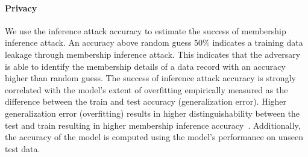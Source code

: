 \paragraph{Privacy}
We use the inference attack accuracy to estimate the success of membership inference attack.
An accuracy above random guess $50\%$ indicates a training data leakage through membership inference attack.
This indicates that the adversary is able to identify the membership details of a data record with an accuracy higher than random guess.
The success of inference attack accuracy is strongly correlated with the model's extent of overfitting empirically measured as the difference between the train and test accuracy (generalization error). Higher generalization error (overfitting) results in higher distinguishability between the test and train resulting in higher membership inference accuracy~\cite{shokri2017membership}.
Additionally, the accuracy of the model is computed using the model's performance on unseen test data.



